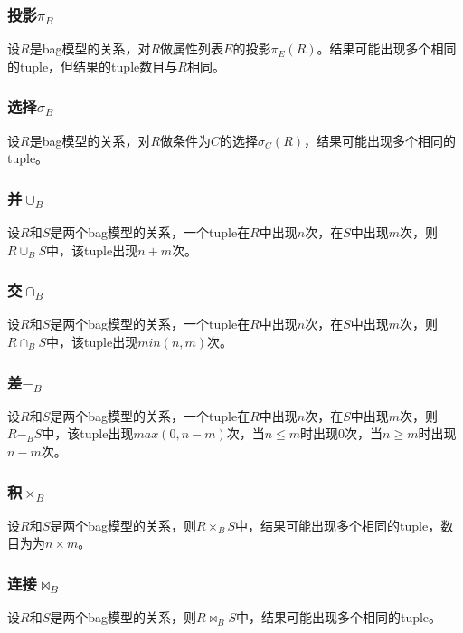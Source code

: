 \subsubsection*{投影$\pi_B$}

设$R$是bag模型的关系，对$R$做属性列表$E$的投影$\pi_E(R)$。结果可能出现多个相同的tuple，但结果的tuple数目与$R$相同。

\subsubsection*{选择$\sigma_B$}

设$R$是bag模型的关系，对$R$做条件为$C$的选择$\sigma_C(R)$，结果可能出现多个相同的tuple。

\subsubsection*{并$\cup_B$}

设$R$和$S$是两个bag模型的关系，一个tuple在$R$中出现$n$次，在$S$中出现$m$次，则$R \cup_B S$中，该tuple出现$n+m$次。

\subsubsection*{交$\cap_B$}

设$R$和$S$是两个bag模型的关系，一个tuple在$R$中出现$n$次，在$S$中出现$m$次，则$R \cap_B S$中，该tuple出现$min(n,m)$次。

\subsubsection*{差$-_B$}

设$R$和$S$是两个bag模型的关系，一个tuple在$R$中出现$n$次，在$S$中出现$m$次，则$R -_B S$中，该tuple出现$max(0,n-m)$次，当$n \le m$时出现$0$次，当$n \ge m$时出现$n-m$次。

\subsubsection*{积$\times_B$}

设$R$和$S$是两个bag模型的关系，则$R \times_B S$中，结果可能出现多个相同的tuple，数目为为$n \times m$。

\subsubsection*{连接$\bowtie_B$}

设$R$和$S$是两个bag模型的关系，则$R \bowtie_B S$中，结果可能出现多个相同的tuple。

